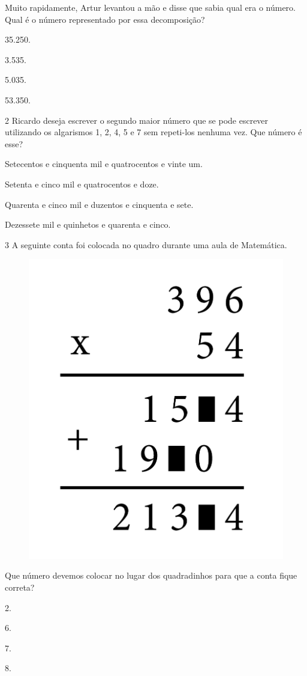 Muito rapidamente, Artur levantou a mão e disse que sabia qual era o
número. Qual é o número representado por essa decomposição?

\begin{multicols}{2}
\begin{escolha}
\item
  35.250.
\item
  3.535.
\item
  5.035.
\item
  53.350.
\end{escolha}
\end{multicols}

\num{2} Ricardo deseja escrever o segundo maior número que se pode escrever
utilizando os algarismos 1, 2, 4, 5 e 7 sem repeti-los nenhuma vez.
Que número é esse?

\begin{escolha}
\item
  Setecentos e cinquenta mil e quatrocentos e vinte um.
\item
  Setenta e cinco mil e quatrocentos e doze.
\item
  Quarenta e cinco mil e duzentos e cinquenta e sete.
\item
  Dezessete mil e quinhetos e quarenta e cinco.
\end{escolha}


\num{3} A seguinte conta foi colocada no quadro durante uma aula de Matemática.

\begin{figure}[htpb!]
\centering
\includegraphics[width=.25\textwidth]{media/image83.png}
\end{figure}

\pagebreak
Que número devemos colocar no lugar dos quadradinhos para que a conta
fique correta?

\begin{multicols}{2}
\begin{escolha}
\item
  2.
\item
  6.
\item
  7.
\item
  8.
\end{escolha}
\end{multicols}

